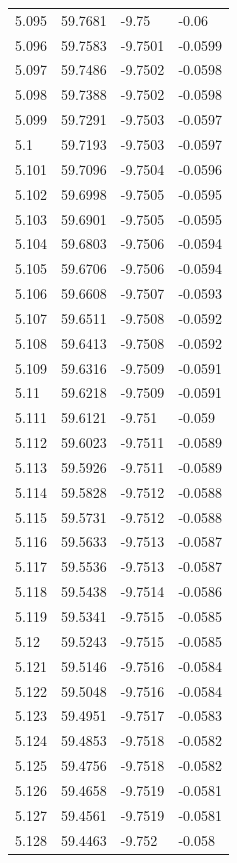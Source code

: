 \begin{tabular}{llll}
5.095 & 59.7681 & -9.75 & -0.06 \\
5.096 & 59.7583 & -9.7501 & -0.0599 \\
5.097 & 59.7486 & -9.7502 & -0.0598 \\
5.098 & 59.7388 & -9.7502 & -0.0598 \\
5.099 & 59.7291 & -9.7503 & -0.0597 \\
5.1 & 59.7193 & -9.7503 & -0.0597 \\
5.101 & 59.7096 & -9.7504 & -0.0596 \\
5.102 & 59.6998 & -9.7505 & -0.0595 \\
5.103 & 59.6901 & -9.7505 & -0.0595 \\
5.104 & 59.6803 & -9.7506 & -0.0594 \\
5.105 & 59.6706 & -9.7506 & -0.0594 \\
5.106 & 59.6608 & -9.7507 & -0.0593 \\
5.107 & 59.6511 & -9.7508 & -0.0592 \\
5.108 & 59.6413 & -9.7508 & -0.0592 \\
5.109 & 59.6316 & -9.7509 & -0.0591 \\
5.11 & 59.6218 & -9.7509 & -0.0591 \\
5.111 & 59.6121 & -9.751 & -0.059 \\
5.112 & 59.6023 & -9.7511 & -0.0589 \\
5.113 & 59.5926 & -9.7511 & -0.0589 \\
5.114 & 59.5828 & -9.7512 & -0.0588 \\
5.115 & 59.5731 & -9.7512 & -0.0588 \\
5.116 & 59.5633 & -9.7513 & -0.0587 \\
5.117 & 59.5536 & -9.7513 & -0.0587 \\
5.118 & 59.5438 & -9.7514 & -0.0586 \\
5.119 & 59.5341 & -9.7515 & -0.0585 \\
5.12 & 59.5243 & -9.7515 & -0.0585 \\
5.121 & 59.5146 & -9.7516 & -0.0584 \\
5.122 & 59.5048 & -9.7516 & -0.0584 \\
5.123 & 59.4951 & -9.7517 & -0.0583 \\
5.124 & 59.4853 & -9.7518 & -0.0582 \\
5.125 & 59.4756 & -9.7518 & -0.0582 \\
5.126 & 59.4658 & -9.7519 & -0.0581 \\
5.127 & 59.4561 & -9.7519 & -0.0581 \\
5.128 & 59.4463 & -9.752 & -0.058 \\

\end{tabular}
